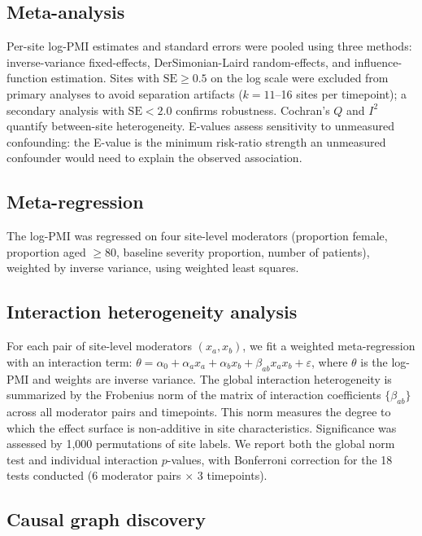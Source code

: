 \documentclass{article}
\begin{document}
\subsection{Meta-analysis}

Per-site log-PMI estimates and standard errors were pooled using three methods: inverse-variance fixed-effects, DerSimonian-Laird random-effects, and influence-function estimation.
Sites with $\text{SE} \geq 0.5$ on the log scale were excluded from primary analyses to avoid separation artifacts ($k = 11$--16 sites per timepoint); a secondary analysis with $\text{SE} < 2.0$ confirms robustness.
Cochran's $Q$ and $I^2$ quantify between-site heterogeneity.
E-values \cite{vanderweele2017} assess sensitivity to unmeasured confounding: the E-value is the minimum risk-ratio strength an unmeasured confounder would need to explain the observed association.

\subsection{Meta-regression}

The log-PMI was regressed on four site-level moderators (proportion female, proportion aged $\geq 80$, baseline severity proportion, number of patients), weighted by inverse variance, using weighted least squares.

\subsection{Interaction heterogeneity analysis}

For each pair of site-level moderators $(x_a, x_b)$, we fit a weighted meta-regression with an interaction term: $\theta = \alpha_0 + \alpha_a x_a + \alpha_b x_b + \beta_{ab} x_a x_b + \varepsilon$, where $\theta$ is the log-PMI and weights are inverse variance.
The global interaction heterogeneity is summarized by the Frobenius norm of the matrix of interaction coefficients $\{\beta_{ab}\}$ across all moderator pairs and timepoints.
This norm measures the degree to which the effect surface is non-additive in site characteristics.
Significance was assessed by 1,000 permutations of site labels.
We report both the global norm test and individual interaction $p$-values, with Bonferroni correction for the 18 tests conducted (6 moderator pairs $\times$ 3 timepoints).

\subsection{Causal graph discovery}
\end{document}
